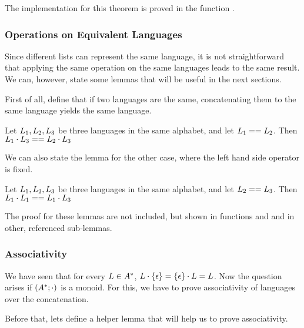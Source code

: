 The implementation for this theorem is proved in the function .

\subsubsection{Operations on Equivalent Languages}

Since different lists can represent the same language, it is not straightforward that applying the same operation on the same languages leads to the same result. We can, however, state some lemmas that will be useful in the next sections.

First of all, define that if two languages are the same, concatenating them to the same language yields the same language.

\begin{lemma}
	\label{lem:clContentEquals}
	Let $L_{1}, L_{2}, L_{3}$ be three languages in the same alphabet, and let $L_{1} == L_{2}$. Then $L_{1} \cdot L_{3} == L_{2} \cdot L_{3}$ 
\end{lemma}

We can also state the lemma for the other case, where the left hand side operator is fixed.

\begin{lemma}
	\label{lem:clContentEquals2}
	Let $L_{1}, L_{2}, L_{3}$ be three languages in the same alphabet, and let $L_{2} == L_{3}$. Then $L_{1} \cdot L_{1} == L_{1} \cdot L_{3}$ 
\end{lemma}

The proof for these lemmas are not included, but shown in functions  and  and in other, referenced sub-lemmas.


\subsubsection{Associativity}

We have seen that for every $L \in A^{*}$, $L \cdot \{\epsilon\} = \{\epsilon\} \cdot L = L$. Now the question arises if $(A^{*};\cdot)$ is a monoid. For this, we have to prove associativity of languages over the concatenation.

Before that, lets define a helper lemma that will help us to prove associativity. 


